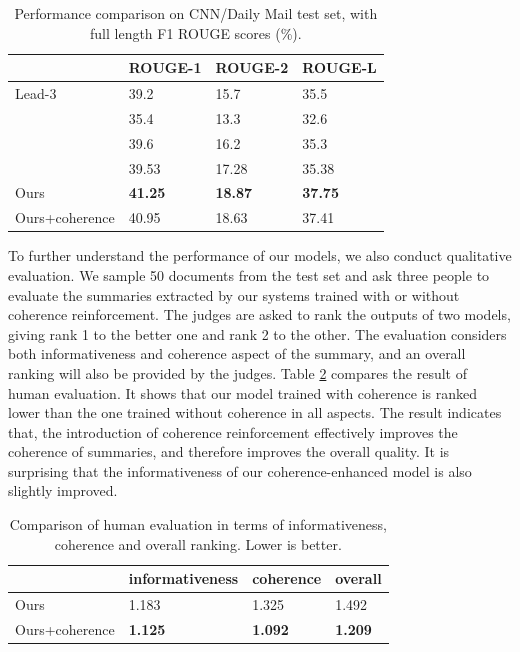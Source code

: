 \documentclass[letterpaper]{article} %
\begin{document}
	\begin{table}[ht]
		\centering
		\caption{Performance comparison on CNN/Daily Mail test set, with full length F1 ROUGE scores (\%).}
		\label{tab:rouge_cnn_dm}
		
		\begin{tabular}{|p{25mm}|p{15mm}|p{15mm}|p{16mm}|}
			\hline
			&ROUGE-1&ROUGE-2&ROUGE-L\\\hline
			Lead-3&39.2&15.7&35.5\\
			\cite{nallapati_ramesh_abstractive_2016}&35.4&13.3&32.6\\
			\cite{SummaRuNNer}&39.6&16.2&35.3\\
			\cite{see_get_2017}&39.53&17.28&35.38\\\hline
			Ours&\textbf{41.25}&\textbf{18.87}&\textbf{37.75}\\
			Ours+coherence&40.95&18.63&37.41\\\hline
		\end{tabular}
	\end{table}
	
	To further understand the performance of our models, we also conduct qualitative evaluation. We sample 50 documents from the test set and ask three people to evaluate the summaries extracted by our systems trained with or without coherence reinforcement. The judges are asked to rank the outputs of two models, giving rank 1 to the better one and rank 2 to the other. The evaluation considers both informativeness and coherence aspect of the summary, and an overall ranking will also be provided by the judges. Table \ref{tab:human_eval} compares the result of human evaluation. It shows that our model trained with coherence is ranked lower than the one trained without coherence in all aspects. The result indicates that, the introduction of coherence reinforcement effectively improves the coherence of summaries, and therefore improves the overall quality. It is surprising that the informativeness of our coherence-enhanced model is also slightly improved. 
	
	\begin{table}[ht]
	\centering
	\caption{Comparison of human evaluation in terms of informativeness, coherence and overall ranking. Lower is better.}
	\label{tab:human_eval}
	
	\begin{tabular}{|p{22mm}|p{22mm}|p{15mm}|p{10mm}|}
		\hline
		&informativeness&coherence&overall\\\hline
		Ours&1.183&1.325&1.492 \\
		Ours+coherence& \textbf{1.125} & \textbf{1.092} & \textbf{1.209} \\\hline
	\end{tabular}
	\end{table}	
	
\end{document}
